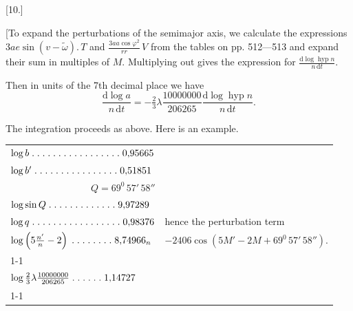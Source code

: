 \clearpage
\begin{landscape}
\begingroup
\fontsize{10}{13}\selectfont
{}
\renewcommand{\headrulewidth}{0pt}
\begin{center}[10.]\end{center}
\par\noindent\hspace*{\parindent}[To expand the perturbations of the semimajor axis, we calculate the expressions \(3ae\sin(v-\tilde\omega)\mathord{.}\,T\) and \(\frac{3aa\cos\varphi^2}{rr}\,V\) from the tables on pp. 512—513 and expand their sum in multiples of \(M\). Multiplying out gives the expression for \(\frac{\mathrm{d}\log\operatorname{hyp}n}{n\,\mathrm{d}t}\).
\par\noindent{}\hspace*{\parindent}Then in units of the 7th decimal place we have
\[
\frac{\mathrm{d}\log a}{n\,\mathrm{d}t}=-\tfrac{2}{3}\lambda\frac{10000000}{206265}\frac{\mathrm{d}\log\operatorname{hyp}n}{n\,\mathrm{d}t}.
\]
\par\noindent\hspace*{\parindent}The integration proceeds as above. Here is an example.
\begingroup
\newcommand{\VTenPoint}{\mathord{.}\mkern5mu}
\newcommand{\VTenFive}{\VTenPoint\VTenPoint\VTenPoint\VTenPoint\VTenPoint}
\begin{center}
\begin{tabular}{@{}l@{\quad}l@{}}
\(\log b\;\VTenFive\VTenFive\VTenFive\VTenPoint\VTenPoint0{,}95665\)&\\
\(\log b'\;\VTenFive\VTenFive\VTenFive\VTenPoint0{,}51851\)&\\
\multicolumn{1}{r}{\(Q=69^0\,57'\,58''\)}&\\
\(\log\sin Q\;\VTenFive\VTenFive\VTenPoint\VTenPoint\VTenPoint9{,}97289\)&\\
\(\log q\;\VTenFive\VTenFive\VTenFive\VTenPoint\VTenPoint0{,}98376\)&hence the perturbation term\\
\(\log\left(5\frac{n'}{n}-2\right)\;\VTenFive\VTenPoint\VTenPoint\VTenPoint8{,}74966_n\)&\(-2406\cos(5M'-2M+69^0\,57'\,58'').\)\\
\cline{1-1}
\multicolumn{1}{r}{\(2{,}23410\)}&\\[3pt]
\(\log\tfrac{2}{3}\lambda\frac{10000000}{206265}\;\VTenFive\VTenPoint1{,}14727\)&\\
\cline{1-1}
\multicolumn{1}{r}{\(3{,}38137_n\)}&

\end{tabular}
\end{center}
\end{landscape}
